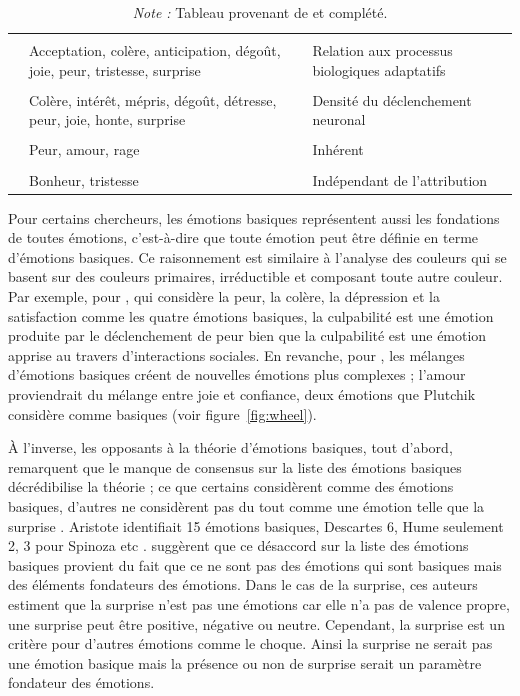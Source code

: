 \documentclass[a4paper,12pt]{report}
\begin{document}
\begin{table}[!ht]
\begin{tabular}{p{4cm} p{7cm} p{4.3cm}}
        &&\\
        \raggedright \textcite{plutchik80a} & \raggedright Acceptation, colère, anticipation, dégoût, joie, peur, tristesse, surprise & \raggedright Relation aux processus biologiques adaptatifs \tabularnewline
        &&\\
        \raggedright \textcite{tomkins84} & \raggedright Colère, intérêt, mépris, dégoût, détresse, peur, joie, honte, surprise & \raggedright Densité du déclenchement neuronal \tabularnewline
        &&\\
        \raggedright \textcite{watson30} & \raggedright Peur, amour, rage & \raggedright Inhérent \tabularnewline
        &&\\
        \raggedright \textcite{weiner84} & \raggedright Bonheur, tristesse & \raggedright Indépendant de l'attribution \tabularnewline
        \hline

    \end{tabular}
	\caption*{\small \textit{Note :} Tableau provenant de \textcite{ortony90} et complété.}
\end{table}


Pour certains chercheurs, les émotions basiques représentent aussi les fondations de toutes émotions, c'est-à-dire que toute émotion peut être définie en terme d'émotions basiques. Ce raisonnement est similaire à l'analyse des couleurs qui se basent sur des couleurs primaires, irréductible et composant toute autre couleur. Par exemple, pour \textcite{kemper87}, qui considère la peur, la colère, la dépression et la satisfaction comme les quatre émotions basiques, la culpabilité est une émotion produite par le déclenchement de peur bien que la culpabilité est une émotion apprise au travers d'interactions sociales. En revanche, pour \textcite{plutchik80}, les mélanges d'émotions basiques créent de nouvelles émotions plus complexes ; l'amour proviendrait du mélange entre joie et confiance, deux émotions que Plutchik considère comme basiques (voir figure~\ref{fig:wheel}). \par 


À l'inverse, les opposants à la théorie d'émotions basiques, tout d'abord, remarquent que le manque de consensus sur la liste des émotions basiques décrédibilise la théorie ; ce que certains considèrent comme des émotions basiques, d'autres ne considèrent pas du tout comme une émotion telle que la surprise \parencite{ortony90}. Aristote identifiait 15 émotions basiques, Descartes 6, Hume seulement 2, 3 pour Spinoza etc \parencite{thamm06}. \textcite{ortony90} suggèrent que ce désaccord sur la liste des émotions basiques provient du fait que ce ne sont pas des émotions qui sont basiques mais des éléments fondateurs des émotions. Dans le cas de la surprise, ces auteurs estiment que la surprise n'est pas une émotions car elle n'a pas de valence propre, une surprise peut être positive, négative ou neutre. Cependant, la surprise est un critère pour d'autres émotions comme le choque. Ainsi la surprise ne serait pas une émotion basique mais la présence ou non de surprise serait un paramètre fondateur des émotions. \par 
\end{document}
